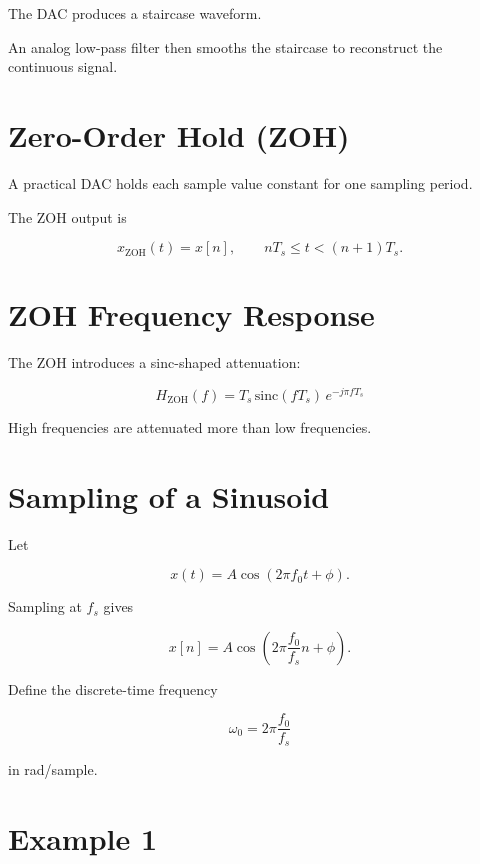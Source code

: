 The DAC produces a staircase waveform.

An analog low-pass filter then smooths the staircase to reconstruct the continuous
signal.


\section{Zero-Order Hold (ZOH)}

A practical DAC holds each sample value constant for one sampling period.

The ZOH output is

\[
x_{\text{ZOH}}(t)=x[n],
\qquad nT_s\le t<(n+1)T_s.
\]


\section{ZOH Frequency Response}

The ZOH introduces a sinc-shaped attenuation:

\[
\boxed{
H_{\text{ZOH}}(f)=
T_s\,\mathrm{sinc}(fT_s)\,
e^{-j\pi fT_s}
}
\]

High frequencies are attenuated more than low frequencies.


\section{Sampling of a Sinusoid}

Let

\[
x(t)=A\cos(2\pi f_0 t+\phi).
\]

Sampling at \(f_s\) gives

\[
x[n]=A\cos\left(2\pi\frac{f_0}{f_s}n+\phi\right).
\]

Define the discrete-time frequency

\[
\boxed{
\omega_0=
2\pi\frac{f_0}{f_s}
}
\]

in rad/sample.


\section{Example 1}

